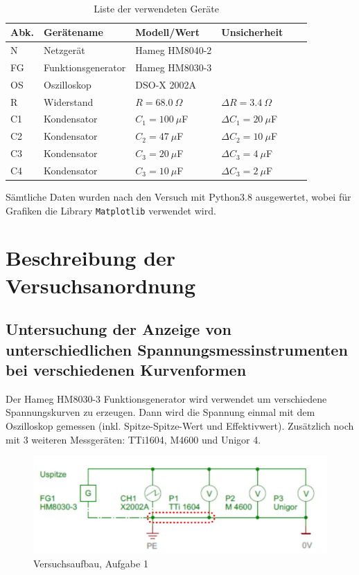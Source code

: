\documentclass{article}
\begin{document}
\begin{table}[H]
\caption{Liste der verwendeten Geräte}

~

\begin{tabular}{l|p{2.5cm}p{3cm}lll}
Abk. & Gerätename    &  Modell/Wert  & Unsicherheit\\
\hline
N & Netzgerät & Hameg HM8040-2 \\
FG & Funktions\-generator & Hameg HM8030-3 \\
OS & Oszilloskop & DSO-X 2002A \\
R & Widerstand & $R=68.0~\Omega$ & $\Delta R = 3.4~\Omega$ \\
C1 & Kondensator & $C_1=100~\mu$F & $\Delta C_1 = 20~\mu$F \\
C2 & Kondensator & $C_2=47~\mu$F & $\Delta C_2 = 10~\mu$F \\
C3 & Kondensator & $C_3=20~\mu$F & $\Delta C_3 = 4~\mu$F \\
C4 & Kondensator & $C_3=10~\mu$F & $\Delta C_3 = 2~\mu$F \\
\end{tabular}
\end{table}

Sämtliche Daten wurden nach den Versuch mit Python3.8 ausgewertet, wobei für Grafiken die Library \texttt{Matplotlib} verwendet wird. 





\section{Beschreibung der Versuchsanordnung}


\subsection{Untersuchung  der  Anzeige  von  unterschiedlichen  Spannungsmessinstrumenten  bei verschiedenen Kurvenformen}
\label{subsec:aufbau_task1}

Der Hameg HM8030-3 Funktionsgenerator wird verwendet um verschiedene Spannungskurven zu erzeugen. Dann wird die Spannung einmal mit dem Oszilloskop gemessen (inkl. Spitze-Spitze-Wert und Effektivwert). Zusätzlich noch mit 3 weiteren Messgeräten: TTi1604, M4600 und Unigor 4.


\begin{figure}[H]
\centering
\caption{Versuchsaufbau, Aufgabe 1}
\label{fig:aufbau_task1}
\includegraphics[scale=1]{bilder/aufbau_task1.png}
\end{figure}
\end{document}
